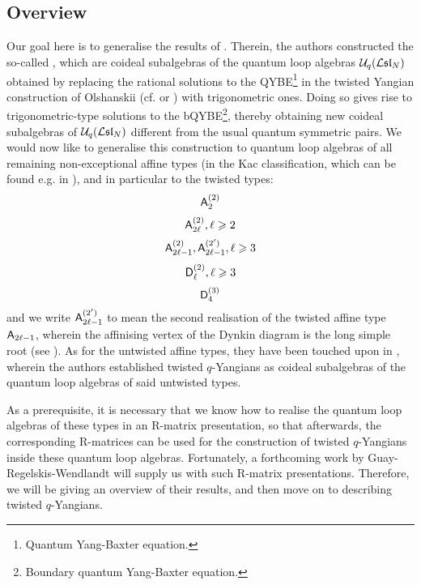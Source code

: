     \subsection{Overview}
        Our goal here is to generalise the results of \cite{molev_ragoucy_sorba_twisted_q_yangians_type_A}. Therein, the authors constructed the so-called , which are coideal subalgebras of the quantum loop algebras $\mathcal{U}_q(\mathcal{L}\mathfrak{sl}_N)$ obtained by replacing the rational solutions to the QYBE\footnote{Quantum Yang-Baxter equation.} in the twisted Yangian construction of Olshanskii (cf. \cite{olshanski_twisted_yangians_and_infinite_dimensional_classical_lie_algebras} or \cite[Chapter 2]{molev_yangians_and_classical_lie_algebras}) with trigonometric ones. Doing so gives rise to trigonometric-type solutions to the bQYBE\footnote{Boundary quantum Yang-Baxter equation.}, thereby obtaining new coideal subalgebras of $\mathcal{U}_q(\mathcal{L}\mathfrak{sl}_N)$ different from the usual quantum symmetric pairs. We would now like to generalise this construction to quantum loop algebras of all remaining non-exceptional affine types (in the Kac classification, which can be found e.g. in \cite[Chapter 4]{kac_infinite_dimensional_lie_algebras}), and in particular to the twisted types:
            $$\mathsf{A}_2^{(2)}$$
            $$\mathsf{A}_{2\ell}^{(2)}, \ell \geqslant 2$$
            $$\mathsf{A}_{2\ell - 1}^{(2)}, \mathsf{A}_{2\ell - 1}^{(2')}, \ell \geqslant 3$$
            $$\mathsf{D}_{\ell}^{(2)}, \ell \geqslant 3$$
            $$\mathsf{D}_4^{(3)}$$
        and we write $\mathsf{A}_{2\ell - 1}^{(2')}$ to mean the second realisation of the twisted affine type $\mathsf{A}_{2\ell - 1}$, wherein the affinising vertex of the Dynkin diagram is the long simple root (see \cite[Chapter 4, Tables Aff 2 and 3, p. 55]{kac_infinite_dimensional_lie_algebras}). As for the untwisted affine types, they have been touched upon in \cite{regelskis_vlaar_reflection_matrices_coideal_subalgebras}, wherein the authors established twisted $q$-Yangians as coideal subalgebras of the quantum loop algebras of said untwisted types.  
        
        As a prerequisite, it is necessary that we know how to realise the quantum loop algebras of these types in an R-matrix presentation, so that afterwards, the corresponding R-matrices can be used for the construction of twisted $q$-Yangians inside these quantum loop algebras. Fortunately, a forthcoming work by Guay-Regelskis-Wendlandt will supply us with such R-matrix presentations. Therefore, we will be giving an overview of their results, and then move on to describing twisted $q$-Yangians.

